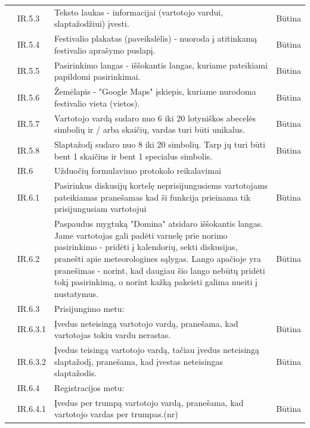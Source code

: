 \documentclass{VUMIFPSkursinis}
\begin{document}
\begin{longtable}{|p{1cm}|p{3cm}|p{9cm}|c|}
 & IR.5.3 & Teksto laukas - informacijai (vartotojo vardui, slaptažodžiui) įvesti. & Būtina \\ \cline{2-4} 
 & IR.5.4 & Festivalio plakatas (paveikslėlis) - nuoroda į atitinkamą festivalio aprašymo puslapį. & Būtina \\ \cline{2-4} 
 & IR.5.5 & Pasirinkimo langas - iššokantis langas, kuriame pateikiami papildomi pasirinkimai. & Būtina \\ \cline{2-4} 
 & IR.5.6 & Žemėlapis - "Google Maps" įskiepis, kuriame nurodoma festivalio vieta (vietos). & Būtina \\ \cline{2-4} 
 & IR.5.7 & Vartotojo vardą sudaro nuo 6 iki 20 lotyniškos abecelės simbolių ir / arba skaičių, vardas turi būti unikalus. & Būtina \\ \cline{2-4} 
 & IR.5.8 & Slaptažodį sudaro nuo 8 iki 20 simbolių. Tarp jų turi būti bent 1 skaičius ir bent 1 specialus simbolis. & Būtina \\ \cline{2-4} 
 &  \cellcolor{light-gray}IR.6 & \multicolumn{2}{l|}{ \cellcolor{light-gray}Užduočių formulavimo protokolo reikalavimai} \\ \cline{2-4} 
 & IR.6.1 & Pasirinkus diskusijų kortelę neprisijungusiems vartotojams pateikiamas pranešamas kad ši funkcija prieinama tik prisijungusiam vartotojui & Būtina \\ \cline{2-4} 
 & IR.6.2 & Paspaudus mygtuką "Domina" atsidaro iššokantis langas. Jame vartotojas gali padėti varnelę prie norimo pasirinkimo - pridėti į kalendorių, sekti diskusijas, pranešti apie meteorologines sąlygas. Lango apačioje yra pranešimas - norint, kad daugiau šio lango nebūtų pridėti tokį pasirinkimą, o norint kažką pakeisti galima nueiti į nustatymus. & Būtina \\ \cline{2-4} 
 & \cellcolor{light-gray} IR.6.3 & \multicolumn{2}{l|}{ \cellcolor{light-gray}Prisijungimo metu:} \\ \cline{2-4} 
 & IR.6.3.1 & Įvedus neteisingą vartotojo vardą, pranešama, kad vartotojas tokiu vardu nerastas. & Būtina \\ \cline{2-4} 
 & IR.6.3.2 & Įvedus teisingą vartotojo vardą, tačiau įvedus neteisingą slaptažodį, pranešama, kad įvestas neteisingas slaptažodis. & Būtina \\ \cline{2-4} 
 &  \cellcolor{light-gray}IR.6.4 & \multicolumn{2}{l|}{ \cellcolor{light-gray}Registracijos metu:} \\ \cline{2-4} 
 & IR.6.4.1 & Įvedus per trumpą vartotojo vardą, pranešama, kad vartotojo vardas per trumpas.(nr) & Būtina \\ \cline{2-4} 

\end{longtable}
\end{document}
